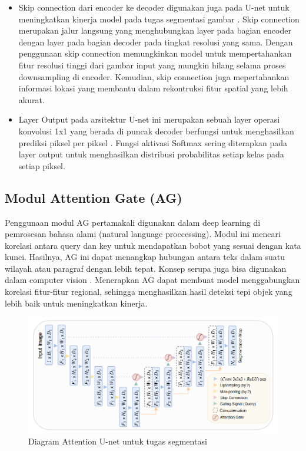 \begin{itemize}
	\item Skip connection dari encoder ke decoder digunakan juga pada U-net untuk meningkatkan kinerja model pada tugas segmentasi gambar \cite{azad_medical_2022}. Skip connection  merupakan jalur langsung yang menghubungkan layer pada bagian encoder dengan layer pada bagian decoder pada tingkat resolusi yang sama. Dengan penggunaan skip connection memungkinkan model untuk mempertahankan fitur resolusi tinggi dari gambar input yang mungkin hilang selama proses downsampling di encoder. Kemudian, skip connection juga mepertahankan informasi lokasi yang membantu dalam rekontruksi fitur spatial yang lebih akurat\cite{siddique_u-net_2020}.
	
	\item Layer Output  pada arsitektur U-net ini merupakan sebuah layer operasi konvolusi 1x1 yang berada di puncak decoder berfungsi untuk menghasilkan prediksi piksel per piksel \cite{huang_fully_2022,azad_medical_2022}. Fungsi aktivasi Softmax sering diterapkan pada layer output untuk menghasilkan distribusi probabilitas setiap kelas pada setiap piksel. 
	
	
\end{itemize}



\subsection{Modul Attention Gate (AG)}

\noindent Penggunaan modul AG pertamakali digunakan dalam deep learning di pemrosesan bahasa alami (natural language proccessing)\cite{azad_medical_2022}. Modul ini mencari korelasi antara query dan key untuk mendapatkan bobot yang sesuai dengan kata kunci. Hasilnya, AG ini dapat menangkap hubungan antara teks dalam suatu wilayah atau paragraf dengan lebih tepat. Konsep serupa juga bisa digunakan dalam computer vision \cite{huang_fully_2022}. Menerapkan AG dapat membuat model menggabungkan korelasi fitur-fitur regional, sehingga menghasilkan hasil deteksi tepi objek yang lebih baik untuk meningkatkan kinerja.

\begin{figure}[H]
	\centering
	\includegraphics[scale=.7]{gambar/AG-U.png}
	\caption{Diagram Attention U-net untuk tugas segmentasi}
	\label{fig:Attention-U-net}
\end{figure}

